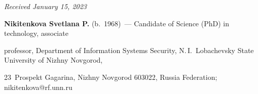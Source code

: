 \vspace*{-6pt}





\hfill{\small\textit{Received January 15, 2023}} 





\vspace*{-12pt} 





\Contrl





\vspace*{-2pt}





\noindent


\textbf{Nikitenkova Svetlana P.} (b.\ 1968)~--- Candidate of Science (PhD) in technology, associate 


professor, Department of Information Systems Security, N.\,I.~Lobachevsky State University of Nizhny Novgorod, 


23~Prospekt Gagarina, Nizhny Novgorod 603022, Russia Federation; \mbox{nikitenkova@rf.unn.ru}





  


 


 


\label{end\stat}





\renewcommand{\bibname}{\protect\rm Литература}    


